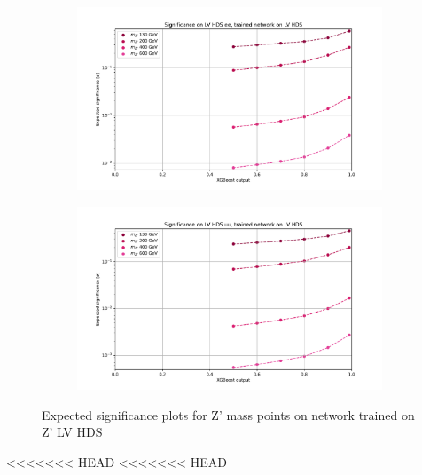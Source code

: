 \documentclass[12pt, a4paper]{book}
\begin{document}
\begin{figure}[!ht]
	\centering
	\begin{subfigure}[b]{0.49\textwidth}
      \centering
      \includegraphics[width=1\textwidth]{XGBoost/LV_HDS/EXP_SIG_ee.pdf}
      \end{subfigure}
   \hfill
   \begin{subfigure}[b]{0.49\textwidth}
      \centering
      \includegraphics[width=1\textwidth]{XGBoost/LV_HDS/EXP_SIG_uu.pdf}
      \end{subfigure}
   \caption{Expected significance plots for Z' mass points on network trained on Z' LV HDS}\label{fig:LV_HDS_exp_sig}
\end{figure}
<<<<<<< HEAD
<<<<<<< HEAD
\end{document}
